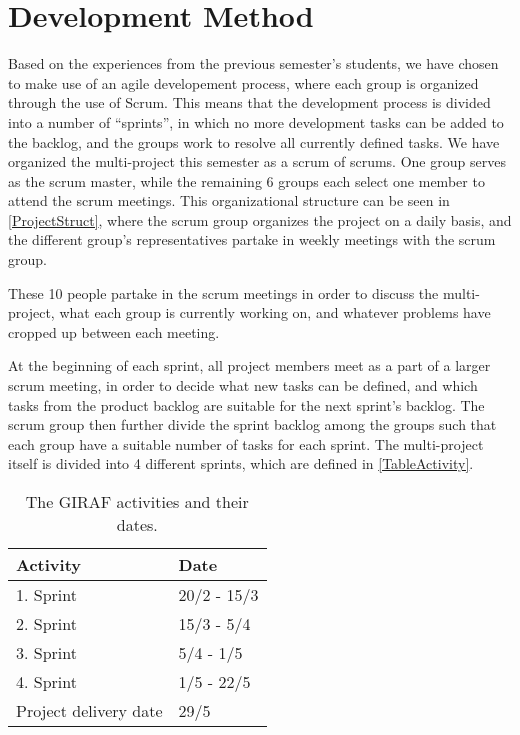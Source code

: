 \section{Development Method}
Based on the experiences from the previous semester's students, we have chosen
to make use of an agile developement process, where each group is organized through
the use of Scrum. This means that the development process is divided into a
number of ``sprints'', in which no more development tasks can be added to the
backlog, and the groups work to resolve all currently defined tasks. We have
organized the multi-project this semester as a scrum of scrums. One group serves
as the scrum master, while the remaining 6 groups each select one member to
attend the scrum meetings. This organizational structure can be seen in
\autoref{ProjectStruct}, where the scrum group organizes the project on a daily
basis, and the different group's representatives partake in weekly meetings with
the scrum group.


These 10 people partake in the scrum meetings in order to discuss the
multi-project, what each group is currently working on, and whatever problems
have cropped up between each meeting.\nl

At the beginning of each sprint, all project members meet as a part of a larger
scrum meeting, in order to decide what new tasks can be defined, and which tasks
from the product backlog are suitable for the next sprint's backlog. The scrum
group then further divide the sprint backlog among the groups such that each
group have a suitable number of tasks for each sprint. The multi-project itself
is divided into 4 different sprints, which are defined in
\autoref{TableActivity}.

\begin{table}[H]
\centering
\begin{tabular}{|l|l|}
\hline
Activity & Date \\ \hline
1. Sprint & 20/2 - 15/3 \\\hline 
2. Sprint & 15/3 - 5/4\\\hline 
3. Sprint & 5/4 - 1/5\\\hline 
4. Sprint & 1/5 - 22/5\\\hline 
Project delivery date & 29/5\\\hline
\end{tabular}
\caption{The GIRAF activities and their dates.}
\label{TableActivity}
\end{table}

